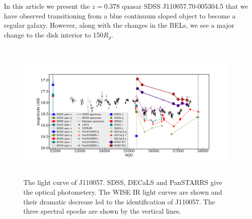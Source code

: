 \documentclass{nature}
\begin{document}
In this article we present the $z=0.378$ quasar SDSS
J110057.70-005304.5 that we have observed transitioning from a blue
continuum sloped object to become a regular galaxy. However, along
with the changes in the BELs, we see a major change to the disk
interior to 150$R_{g}$.
 
\begin{figure}
  \centering
  \includegraphics[width=16.00cm, height=7.00cm, trim=0.0cm 0.0cm 0.0cm 0.0cm, clip]
  {../plots/lc/J110057_lc_20171016.pdf}
  \caption[]{The light curve of J110057. SDSS, DECaLS and PanSTARRS
    give the optical photometery. The WISE IR light curves are shown and
    their dramatic decrease led to the identification of J110057. The
    three spectral epochs are shown by the vertical lines.}
  \label{fig:J110057_LC_CRTS}
\end{figure}
\end{document}
